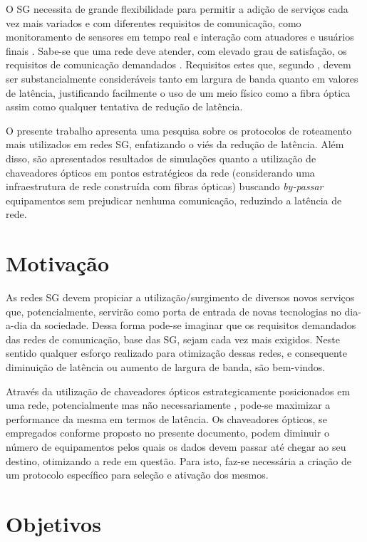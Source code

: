 O SG necessita de grande flexibilidade para permitir a adição de serviços cada vez mais variados e com diferentes requisitos de comunicação, como monitoramento de sensores em tempo real e interação com atuadores e usuários finais \cite{Art-Aggarwal2010}. Sabe-se que uma rede  deve atender, com elevado grau de satisfação, os requisitos de comunicação demandados \cite{Conf-Lobo2008}. Requisitos estes que, segundo \cite{Art-Aggarwal2010}, devem ser substancialmente consideráveis tanto em largura de banda quanto em valores de latência, justificando facilmente o uso de um meio físico como a fibra óptica assim como qualquer tentativa de redução de latência. 

O presente trabalho apresenta uma pesquisa sobre os protocolos de roteamento mais utilizados em redes SG, enfatizando o viés da redução de latência. Além disso, são apresentados resultados de simulações quanto a utilização de chaveadores ópticos em pontos estratégicos da rede (considerando uma infraestrutura de rede construída com fibras ópticas) buscando \emph{by-passar} equipamentos sem prejudicar nenhuma comunicação, reduzindo a latência de rede.

\section{Motivação}
As redes SG devem propiciar a utilização/surgimento de diversos novos serviços que, potencialmente, servirão como porta de entrada de novas tecnologias no dia-a-dia da sociedade. Dessa forma pode-se imaginar que os requisitos demandados das redes de comunicação, base das SG, sejam cada vez mais exigidos. Neste sentido qualquer esforço realizado para otimização dessas redes, e consequente diminuição de latência ou aumento de largura de banda, são bem-vindos.

Através da utilização de chaveadores ópticos estrategicamente posicionados em uma rede, potencialmente mas não necessariamente , pode-se maximizar a performance da mesma em termos de latência. Os chaveadores ópticos, se empregados conforme proposto no presente documento, podem diminuir o número de equipamentos pelos quais os dados devem passar até chegar ao seu destino, otimizando a rede em questão. Para isto, faz-se necessária a criação de um protocolo específico para seleção e ativação dos mesmos.

\section{Objetivos}
